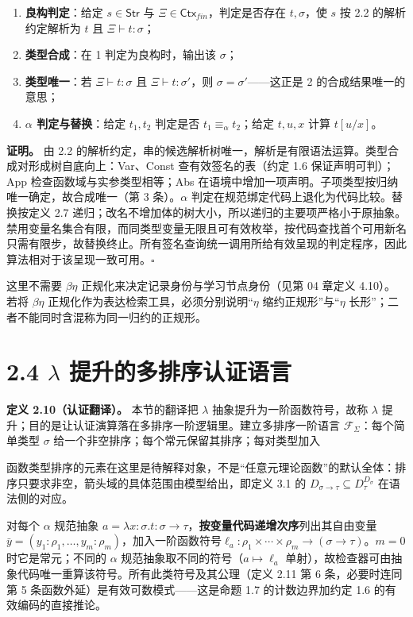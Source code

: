 \documentclass[UTF8,a4paper,zihao=-4,fontset=windows,openany]{ctexbook}
\newcommand{\mcsdisplay}[1]{%
  \par\addvspace{0.7em}%
  \sbox{\mcsmathbox}{\ensuremath{\displaystyle #1}}%
  \ifdim\wd\mcsmathbox>\linewidth
    \noindent\resizebox{\linewidth}{!}{\usebox{\mcsmathbox}}%
  \else
    \noindent\hspace*{\fill}\usebox{\mcsmathbox}\hspace*{\fill}%
  \fi
  \par\addvspace{0.7em}%
}
\def\ensuremath#1{#1}%
\def\operatorname#1{#1}%
\def\mathrm#1{#1}%
\begin{document}
\begin{enumerate}
\item \textbf{良构判定}：给定 \(s\in\mathsf{Str}\) 与 \(\Xi\in\mathsf{Ctx}_{\mathrm{fin}}\)，判定是否存在 \(t,\sigma\)，使 \(s\) 按 2.2 的解析约定解析为 \(t\) 且 \(\Xi\vdash t:\sigma\)；
\item \textbf{类型合成}：在 1 判定为良构时，输出该 \(\sigma\)；
\item \textbf{类型唯一}：若 \(\Xi\vdash t:\sigma\) 且 \(\Xi\vdash t:\sigma'\)，则 \(\sigma=\sigma'\)——这正是 2 的合成结果唯一的意思；
\item \textbf{\(\alpha\) 判定与替换}：给定 \(t_1,t_2\) 判定是否 \(t_1\equiv_\alpha t_2\)；给定 \(t,u,x\) 计算 \(t[u/x]\)。
\end{enumerate}
\textbf{证明。} 由 2.2 的解析约定，串的候选解析树唯一，解析是有限语法运算。类型合成对形成树自底向上：Var、Const 查有效签名的表（约定 1.6 保证声明可判）；App 检查函数域与实参类型相等；Abs 在语境中增加一项声明。子项类型按归纳唯一确定，故合成唯一（第 3 条）。\(\alpha\) 判定在规范绑定代码上退化为代码比较。替换按定义 2.7 递归；改名不增加体的树大小，所以递归的主要项严格小于原抽象。禁用变量名集合有限，而同类型变量无限且可有效枚举，按代码查找首个可用新名只需有限步，故替换终止。所有签名查询统一调用所给有效呈现的判定程序，因此算法相对于该呈现一致可用。\(\square\)

这里不需要 \(\beta\eta\) 正规化来决定记录身份与学习节点身份（见第 04 章定义 4.10）。若将 \(\beta\eta\) 正规化作为表达检索工具，必须分别说明\(“\eta\) 缩约正规形”与\(“\eta\) 长形”；二者不能同时含混称为同一归约的正规形。

\section{\texorpdfstring{2.4 \(\lambda\) 提升的多排序认证语言}{2.4 λ 提升的多排序认证语言}}
\textbf{定义 2.10（认证翻译）。} 本节的翻译把 \(\lambda\) 抽象提升为一阶函数符号，故称 \(\lambda\) 提升；目的是让认证演算落在多排序一阶逻辑里。建立多排序一阶语言 \(\mathcal F_\Sigma\)：每个简单类型 \(\sigma\) 给一个非空排序；每个常元保留其排序；每对类型加入


\mcsdisplay{\operatorname{app}_{\sigma,\tau}:
(\sigma\to\tau)\times\sigma\longrightarrow\tau .}
\noindent 函数类型排序的元素在这里是待解释对象，不是“任意元理论函数”的默认全体：排序只要求非空，箭头域的具体范围由模型给出，即定义 3.1 的 \(D_{\sigma\to\tau}\subseteq D_\tau^{D_\sigma}\) 在语法侧的对应。

对每个 \(\alpha\) 规范抽象 \(a=\lambda x:\sigma.t:\sigma\to\tau\)，\textbf{按变量代码递增次序}列出其自由变量\(\bar y=(y_1:\rho_1,\ldots,y_m:\rho_m)\)，加入一阶函数符号\(\ell_a:\rho_1\times\cdots\times\rho_m\to(\sigma\to\tau)\)。\(m=0\) 时它是常元；不同的 \(\alpha\) 规范抽象取不同的符号（\(a\mapsto\ell_a\) 单射），故检查器可由抽象代码唯一重算该符号。所有此类符号及其公理（定义 2.11 第 6 条，必要时连同第 5 条函数外延）是有效可数模式——这是命题 1.7 的计数边界加约定 1.6 的有效编码的直接推论。
\end{document}
